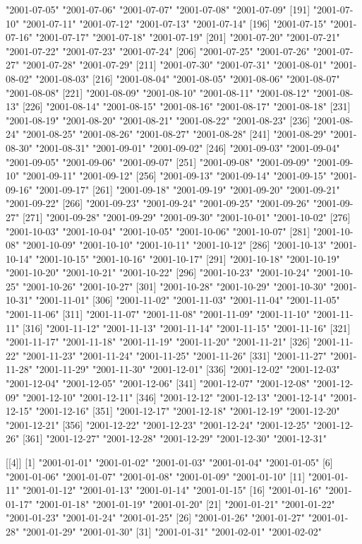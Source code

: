 \documentclass[
]{jss}
\begin{document}
\begin{CodeChunk}
\begin{CodeOutput}
[186] "2001-07-05" "2001-07-06" "2001-07-07" "2001-07-08" "2001-07-09"
[191] "2001-07-10" "2001-07-11" "2001-07-12" "2001-07-13" "2001-07-14"
[196] "2001-07-15" "2001-07-16" "2001-07-17" "2001-07-18" "2001-07-19"
[201] "2001-07-20" "2001-07-21" "2001-07-22" "2001-07-23" "2001-07-24"
[206] "2001-07-25" "2001-07-26" "2001-07-27" "2001-07-28" "2001-07-29"
[211] "2001-07-30" "2001-07-31" "2001-08-01" "2001-08-02" "2001-08-03"
[216] "2001-08-04" "2001-08-05" "2001-08-06" "2001-08-07" "2001-08-08"
[221] "2001-08-09" "2001-08-10" "2001-08-11" "2001-08-12" "2001-08-13"
[226] "2001-08-14" "2001-08-15" "2001-08-16" "2001-08-17" "2001-08-18"
[231] "2001-08-19" "2001-08-20" "2001-08-21" "2001-08-22" "2001-08-23"
[236] "2001-08-24" "2001-08-25" "2001-08-26" "2001-08-27" "2001-08-28"
[241] "2001-08-29" "2001-08-30" "2001-08-31" "2001-09-01" "2001-09-02"
[246] "2001-09-03" "2001-09-04" "2001-09-05" "2001-09-06" "2001-09-07"
[251] "2001-09-08" "2001-09-09" "2001-09-10" "2001-09-11" "2001-09-12"
[256] "2001-09-13" "2001-09-14" "2001-09-15" "2001-09-16" "2001-09-17"
[261] "2001-09-18" "2001-09-19" "2001-09-20" "2001-09-21" "2001-09-22"
[266] "2001-09-23" "2001-09-24" "2001-09-25" "2001-09-26" "2001-09-27"
[271] "2001-09-28" "2001-09-29" "2001-09-30" "2001-10-01" "2001-10-02"
[276] "2001-10-03" "2001-10-04" "2001-10-05" "2001-10-06" "2001-10-07"
[281] "2001-10-08" "2001-10-09" "2001-10-10" "2001-10-11" "2001-10-12"
[286] "2001-10-13" "2001-10-14" "2001-10-15" "2001-10-16" "2001-10-17"
[291] "2001-10-18" "2001-10-19" "2001-10-20" "2001-10-21" "2001-10-22"
[296] "2001-10-23" "2001-10-24" "2001-10-25" "2001-10-26" "2001-10-27"
[301] "2001-10-28" "2001-10-29" "2001-10-30" "2001-10-31" "2001-11-01"
[306] "2001-11-02" "2001-11-03" "2001-11-04" "2001-11-05" "2001-11-06"
[311] "2001-11-07" "2001-11-08" "2001-11-09" "2001-11-10" "2001-11-11"
[316] "2001-11-12" "2001-11-13" "2001-11-14" "2001-11-15" "2001-11-16"
[321] "2001-11-17" "2001-11-18" "2001-11-19" "2001-11-20" "2001-11-21"
[326] "2001-11-22" "2001-11-23" "2001-11-24" "2001-11-25" "2001-11-26"
[331] "2001-11-27" "2001-11-28" "2001-11-29" "2001-11-30" "2001-12-01"
[336] "2001-12-02" "2001-12-03" "2001-12-04" "2001-12-05" "2001-12-06"
[341] "2001-12-07" "2001-12-08" "2001-12-09" "2001-12-10" "2001-12-11"
[346] "2001-12-12" "2001-12-13" "2001-12-14" "2001-12-15" "2001-12-16"
[351] "2001-12-17" "2001-12-18" "2001-12-19" "2001-12-20" "2001-12-21"
[356] "2001-12-22" "2001-12-23" "2001-12-24" "2001-12-25" "2001-12-26"
[361] "2001-12-27" "2001-12-28" "2001-12-29" "2001-12-30" "2001-12-31"

[[4]]
 [1] "2001-01-01" "2001-01-02" "2001-01-03" "2001-01-04" "2001-01-05"
 [6] "2001-01-06" "2001-01-07" "2001-01-08" "2001-01-09" "2001-01-10"
[11] "2001-01-11" "2001-01-12" "2001-01-13" "2001-01-14" "2001-01-15"
[16] "2001-01-16" "2001-01-17" "2001-01-18" "2001-01-19" "2001-01-20"
[21] "2001-01-21" "2001-01-22" "2001-01-23" "2001-01-24" "2001-01-25"
[26] "2001-01-26" "2001-01-27" "2001-01-28" "2001-01-29" "2001-01-30"
[31] "2001-01-31" "2001-02-01" "2001-02-02"


\end{CodeOutput}
\end{CodeChunk}
\end{document}
